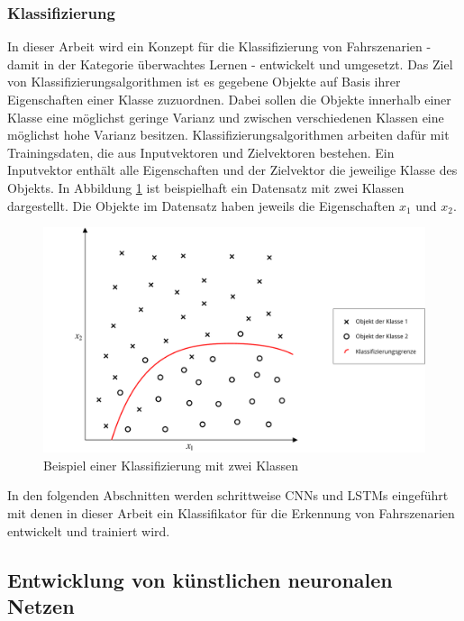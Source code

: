 \subsubsection{Klassifizierung}

In dieser Arbeit wird ein Konzept für die Klassifizierung von Fahrszenarien - damit in der Kategorie überwachtes Lernen - entwickelt und umgesetzt. Das Ziel von Klassifizierungsalgorithmen ist es gegebene Objekte auf Basis ihrer Eigenschaften einer Klasse zuzuordnen. Dabei sollen die Objekte innerhalb einer Klasse eine möglichst geringe Varianz und zwischen verschiedenen Klassen eine möglichst hohe Varianz besitzen. Klassifizierungsalgorithmen arbeiten dafür mit Trainingsdaten, die aus Inputvektoren und Zielvektoren bestehen. Ein Inputvektor enthält alle Eigenschaften und der Zielvektor die jeweilige Klasse des Objekts. In Abbildung \ref{fig_klassifizierung} ist beispielhaft ein Datensatz mit zwei Klassen dargestellt. Die Objekte im Datensatz haben jeweils die Eigenschaften $x_1$ und $x_2$.

\begin{figure}[h]
\centering
\includegraphics[scale=0.5]{images/klassifizierung.pdf}
\caption{Beispiel einer Klassifizierung mit zwei Klassen}
\label{fig_klassifizierung}
\end{figure}

In den folgenden Abschnitten werden schrittweise \acp{CNN} und \acp{LSTM} eingeführt mit denen in dieser Arbeit ein Klassifikator für die Erkennung von Fahrszenarien entwickelt und trainiert wird.


\subsection{Entwicklung von künstlichen neuronalen Netzen}
\label{grundlagen_nn_entwicklung}

